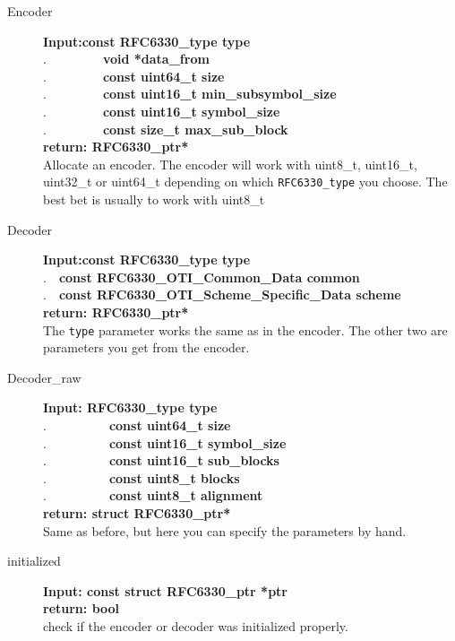 \documentclass[11pt,a4paper]{refart}
\begin{document}
\begin{description}
\item[Encoder] \textbf{Input:const RFC6330\_type type}\\
.\ \ \ \ \ \ \ \ \ \textbf{void *data\_from}\\
.\ \ \ \ \ \ \ \ \ \textbf{const uint64\_t size}\\
.\ \ \ \ \ \ \ \ \ \textbf{const uint16\_t min\_subsymbol\_size}\\
.\ \ \ \ \ \ \ \ \ \textbf{const uint16\_t symbol\_size}\\
.\ \ \ \ \ \ \ \ \ \textbf{const size\_t max\_sub\_block}\\
\textbf{return: RFC6330\_ptr*}\\
Allocate an encoder. The encoder will work with uint8\_t, uint16\_t, uint32\_t or uint64\_t depending on which \texttt{RFC6330\_type} you choose. The best bet is usually to work with uint8\_t

\item[Decoder] \textbf{Input:const RFC6330\_type type}\\
.\ \ \textbf{const RFC6330\_OTI\_Common\_Data common}\\
.\ \ \textbf{const RFC6330\_OTI\_Scheme\_Specific\_Data scheme}\\
\textbf{return: RFC6330\_ptr*}\\
The \texttt{type} parameter works the same as in the encoder. The other two are parameters you get from the encoder.

\item[Decoder\_raw] \textbf{Input: RFC6330\_type type}\\
.\ \ \ \ \ \ \ \ \ \ \textbf{const uint64\_t size}\\
.\ \ \ \ \ \ \ \ \ \ \textbf{const uint16\_t symbol\_size}\\
.\ \ \ \ \ \ \ \ \ \ \textbf{const uint16\_t sub\_blocks}\\
.\ \ \ \ \ \ \ \ \ \ \textbf{const uint8\_t blocks}\\
.\ \ \ \ \ \ \ \ \ \ \textbf{const uint8\_t alignment}\\
\textbf{return: struct RFC6330\_ptr*}\\
Same as before, but here you can specify the parameters by hand.

\item[initialized]\textbf{Input: const struct RFC6330\_ptr *ptr}\\
\textbf{return: bool}\\
check if the encoder or decoder was initialized properly.

\end{description}
\end{document}
